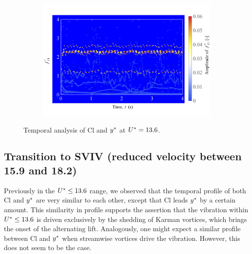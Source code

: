 \documentclass[oneside]{utmthesis}
\begin{document}
\begin{figure} \continuedfloat
  \centering
  \begin{subfigure}[h]{1\textwidth}
    \includegraphics[width=\textwidth]{figs/tempAnalysisLower-c}
    \caption{}
    \label{fig:tempAnalysisLower-c}
  \end{subfigure}
  \caption{Temporal analysis of Cl and $y^{*}$ at $U^{*} = 13.6$.} \label{fig:tempAnalysisLower}
\end{figure}

\subsection{Transition to SVIV (reduced velocity between 15.9 and 18.2)} \label{ssec:transSVIV}
Previously in the $U^{*} \leq 13.6$ range, we observed that the temporal profile of both Cl and  $y^{*}$ are very similar to each other, except that Cl leads $y^{*}$ by a certain amount. This similarity in profile supports the assertion that the vibration within $U^{*} \leq 13.6$ is driven exclusively by the shedding of Karman vortices, which brings the onset of the alternating lift. Analogously, one might expect a similar profile between Cl and $y^{*}$ when streamwise vortices drive the vibration. However, this does not seem to be the case.
\end{document}
